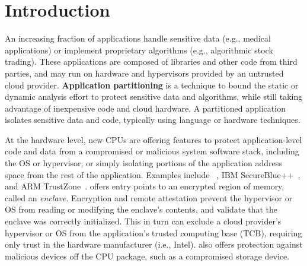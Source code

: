 \section{Introduction}
\label{sec:intro}


An increasing fraction of applications handle sensitive data (e.g., medical applications)
or implement proprietary algorithms (e.g., algorithmic stock trading).
These applications are composed of 
libraries and other code from third parties, and may run on 
hardware and hypervisors provided by an untrusted cloud provider.
{\bf Application partitioning} is a technique to 
bound the 
static or dynamic analysis effort to protect sensitive data and algorithms,
while still taking advantage of inexpensive code and cloud hardware.
A partitioned application isolates sensitive data and code, typically using
language or hardware techniques.


At the hardware level, 
new CPUs are offering features to protect application-level code and data
from a  compromised or malicious system software stack,
including the OS or hypervisor, or simply isolating portions of the 
application address space from the rest of the application.
Examples include \intel{} \sgx{}~\cite{sgx-manual}, 
IBM SecureBlue++~\cite{secureblue++}, and ARM TrustZone~\cite{trustzone}.
\sgx{} offers %
entry points to an encrypted region of memory, called an {\em enclave}.
Encryption and remote attestation 
prevent the hypervisor or OS from reading or modifying the enclave's contents,
and validate that the enclave was correctly initialized.
This in turn
can exclude 
a cloud provider's hypervisor or OS from the application's trusted computing base (TCB),
requiring only trust in the hardware manufacturer (i.e., Intel).
\sgx{} also offers protection against malicious devices off the CPU package,
such as a compromised storage device.

